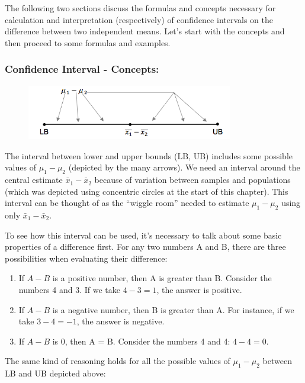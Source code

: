 \documentclass[11pt, chapterprefix=true]{scrbook}\usepackage[]{graphicx}\usepackage[]{color}
\begin{document}
The following two sections discuss the formulas and concepts necessary for calculation and interpretation (respectively) of confidence intervals on the difference between two independent means. Let’s start with the concepts and then proceed to some formulas and examples.

\subsubsection{Confidence Interval - Concepts:}

\begin{figure}[ht]
\centering
\includegraphics[width=9cm]{chapters/Chapter_11/ext_figure/2sample.png} %
\end{figure}

The interval between lower and upper bounds (LB, UB) includes some possible values of $\mu_1 - \mu_2$  (depicted by the many arrows). We need an interval around the central estimate $\bar{x}_1 - \bar{x}_2$ because of variation between samples and populations (which was depicted using concentric circles at the start of this chapter). This interval can be thought of as the ``wiggle room'' needed to estimate $\mu_1 - \mu_2$ using only $\bar{x}_1 - \bar{x}_2$.

To see how this interval can be used, it's necessary to talk about some basic properties of a difference first.  For any two numbers A and B, there are three possibilities when evaluating their difference:

\begin{enumerate}
  \item If $A - B$ is a positive number, then A is greater than B. Consider the numbers 4 and 3. If we take $4 - 3 = 1$, the answer is positive.

  \item If $A - B$ is a negative number, then B is greater than A.  For instance, if we take  $3 - 4 = -1$, the answer is negative.

  \item If $A - B$ is 0, then A = B. Consider the numbers 4 and 4: $4 - 4 = 0$.
\end{enumerate}

The same kind of reasoning holds for all the possible values of $\mu_1 - \mu_2$ between LB and UB depicted above:
\end{document}
